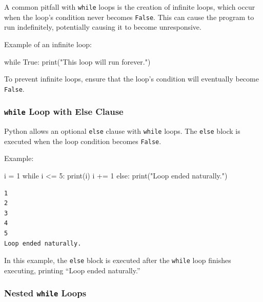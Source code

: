 \documentclass[
  letterpaper,
  DIV=11,
  numbers=noendperiod]{scrreprt}
\newenvironment{Shaded}{\begin{snugshade}}{\end{snugshade}}
\newcommand{\BuiltInTok}[1]{\textcolor[rgb]{0.00,0.23,0.31}{#1}}
\newcommand{\ControlFlowTok}[1]{\textcolor[rgb]{0.00,0.23,0.31}{#1}}
\newcommand{\DecValTok}[1]{\textcolor[rgb]{0.68,0.00,0.00}{#1}}
\newcommand{\NormalTok}[1]{\textcolor[rgb]{0.00,0.23,0.31}{#1}}
\newcommand{\OperatorTok}[1]{\textcolor[rgb]{0.37,0.37,0.37}{#1}}
\newcommand{\StringTok}[1]{\textcolor[rgb]{0.13,0.47,0.30}{#1}}
\newcommand{\VariableTok}[1]{\textcolor[rgb]{0.07,0.07,0.07}{#1}}
\begin{document}
A common pitfall with \texttt{while} loops is the creation of infinite
loops, which occur when the loop's condition never becomes
\texttt{False}. This can cause the program to run indefinitely,
potentially causing it to become unresponsive.

Example of an infinite loop:

\begin{Shaded}
\begin{Highlighting}[]
\ControlFlowTok{while} \VariableTok{True}\NormalTok{:}
    \BuiltInTok{print}\NormalTok{(}\StringTok{"This loop will run forever."}\NormalTok{)}
\end{Highlighting}
\end{Shaded}

To prevent infinite loops, ensure that the loop's condition will
eventually become \texttt{False}.

\hypertarget{while-loop-with-else-clause}{%
\subsubsection{\texorpdfstring{\texttt{while} Loop with Else
Clause}{while Loop with Else Clause}}\label{while-loop-with-else-clause}}

Python allows an optional \texttt{else} clause with \texttt{while}
loops. The \texttt{else} block is executed when the loop condition
becomes \texttt{False}.

Example:

\begin{Shaded}
\begin{Highlighting}[]
\NormalTok{i }\OperatorTok{=} \DecValTok{1}
\ControlFlowTok{while}\NormalTok{ i }\OperatorTok{\textless{}=} \DecValTok{5}\NormalTok{:}
    \BuiltInTok{print}\NormalTok{(i)}
\NormalTok{    i }\OperatorTok{+=} \DecValTok{1}
\ControlFlowTok{else}\NormalTok{:}
    \BuiltInTok{print}\NormalTok{(}\StringTok{"Loop ended naturally."}\NormalTok{)}
\end{Highlighting}
\end{Shaded}

\begin{verbatim}
1
2
3
4
5
Loop ended naturally.
\end{verbatim}

In this example, the \texttt{else} block is executed after the
\texttt{while} loop finishes executing, printing ``Loop ended
naturally.''

\hypertarget{nested-while-loops}{%
\subsubsection{\texorpdfstring{Nested \texttt{while}
Loops}{Nested while Loops}}\label{nested-while-loops}}
\end{document}
